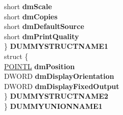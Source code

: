 \begin{DoxyCompactItemize}
\begin{tabbing}
\>\>short {\bfseries dmScale}\\
\>\>short {\bfseries dmCopies}\\
\>\>short {\bfseries dmDefaultSource}\\
\>\>short {\bfseries dmPrintQuality}\\
\>\} {\bfseries DUMMYSTRUCTNAME1}\\
\>struct \{\\
\>\>\hyperlink{struct___p_o_i_n_t_l}{POINTL} {\bfseries dmPosition}\\
\>\>DWORD {\bfseries dmDisplayOrientation}\\
\>\>DWORD {\bfseries dmDisplayFixedOutput}\\
\>\} {\bfseries DUMMYSTRUCTNAME2}\\
\} {\bfseries DUMMYUNIONNAME1}\\


\end{tabbing}
\end{DoxyCompactItemize}
